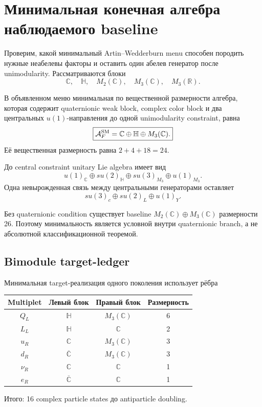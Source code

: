\chapter{Минимальная конечная алгебра наблюдаемого baseline}

Проверим, какой минимальный Artin--Wedderburn menu способен породить нужные
неабелевы факторы и оставить один абелев генератор после unimodularity.
Рассматриваются блоки
\begin{equation}
\mathbb C,\quad \mathbb H,\quad M_2(\mathbb C),\quad
M_3(\mathbb C),\quad M_3(\mathbb R).
\end{equation}

\begin{proposition}
В объявленном меню минимальная по вещественной размерности алгебра, которая
содержит quaternionic weak block, complex color block и два центральных
\(u(1)\)-направления до одной unimodularity constraint, равна
\begin{equation}
\boxed{\mathcal A_F^{\rm SM}=\mathbb C\oplus\mathbb H\oplus M_3(\mathbb C).}
\end{equation}
Её вещественная размерность равна \(2+4+18=24\).
\end{proposition}

До central constraint unitary Lie algebra имеет вид
\begin{equation}
u(1)_{\mathbb C}\oplus su(2)_{\mathbb H}\oplus
su(3)_{M_3}\oplus u(1)_{M_3}.
\end{equation}
Одна невырожденная связь между центральными генераторами оставляет
\begin{equation}
\boxed{su(3)_c\oplus su(2)_L\oplus u(1)_Y.}
\end{equation}

Без quaternionic condition существует baseline
\(M_2(\mathbb C)\oplus M_3(\mathbb C)\) размерности 26. Поэтому
минимальность является условной внутри quaternionic branch, а не абсолютной
классификационной теоремой.

\section{Bimodule target-ledger}

Минимальная target-реализация одного поколения использует рёбра
\begin{center}
\begin{tabular}{cccc}
\toprule
Multiplet & Левый блок & Правый блок & Размерность \\
\midrule
\(Q_L\) & \(\mathbb H\) & \(M_3(\mathbb C)\) & 6 \\
\(L_L\) & \(\mathbb H\) & \(\mathbb C\) & 2 \\
\(u_R\) & \(\mathbb C\) & \(M_3(\mathbb C)\) & 3 \\
\(d_R\) & \(\overline{\mathbb C}\) & \(M_3(\mathbb C)\) & 3 \\
\(\nu_R\) & \(\mathbb C\) & \(\mathbb C\) & 1 \\
\(e_R\) & \(\overline{\mathbb C}\) & \(\mathbb C\) & 1 \\
\bottomrule
\end{tabular}
\end{center}
Итого: 16 complex particle states до antiparticle doubling.

